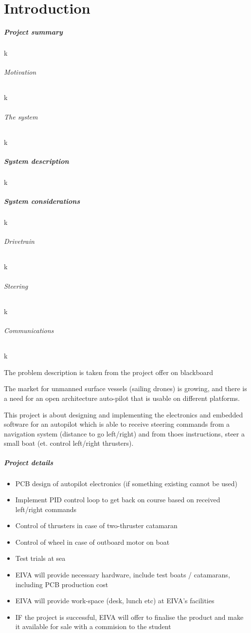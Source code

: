 \chapter{Introduction}

\paragraph{Project summary}
k

\subparagraph{Motivation}
k

\subparagraph{The system}
k

\paragraph{System description}
k

\paragraph{System considerations}
k

\subparagraph{Drivetrain}
k

\subparagraph{Steering}
k

\subparagraph{Communications}
k

The problem description is taken from the project offer on blackboard\cite{EIVA-description}

The market for unmanned surface vessels (sailing drones) is growing, and there is a need for an open architecture auto-pilot that is usable on different platforms.

This project is about designing and implementing the electronics and embedded software for an autopilot which is able to receive steering commands from a navigation system (distance to go left/right) and from thoes instructions, steer a small boat (et. control left/right thrusters).


\paragraph{Project details}
\begin{itemize}
\item PCB design of autopilot electronics (if something existing cannot be used)
\item Implement PID control loop to get back on course based on received left/right commands
\item Control of thrusters in case of two-thruster catamaran
\item Control of wheel in case of outboard motor on boat
\item Test trials at sea
\item EIVA will provide necessary hardware, include test boats / catamarans, including PCB production cost
\item EIVA will provide work-space (desk, lunch etc) at EIVA's facilities
\item IF the project is successful, EIVA will offer to finalise the product and make it available for sale with a commision to the student
\end{itemize}
